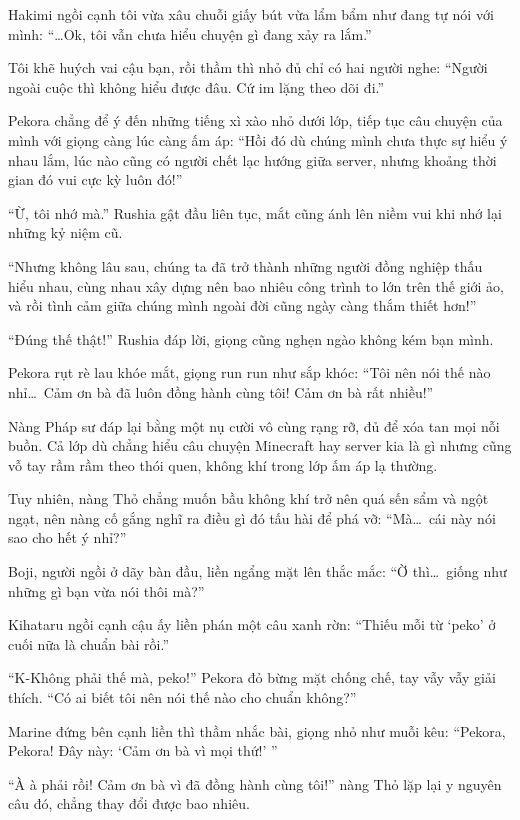 \documentclass[../main.tex]{subfiles}
\begin{document}
Hakimi ngồi cạnh tôi vừa xâu chuỗi giấy bút vừa lẩm bẩm như đang tự nói với mình: ``\dots Ok, tôi vẫn chưa hiểu chuyện gì đang xảy ra lắm.''

Tôi khẽ huých vai cậu bạn, rồi thầm thì nhỏ đủ chỉ có hai người nghe: ``Người ngoài cuộc thì không hiểu được đâu. Cứ im lặng theo dõi đi.''

Pekora chẳng để ý đến những tiếng xì xào nhỏ dưới lớp, tiếp tục câu chuyện của mình với giọng càng lúc càng ấm áp: ``Hồi đó dù chúng mình chưa thực sự hiểu ý nhau lắm, lúc nào cũng có người chết lạc hướng giữa server, nhưng khoảng thời gian đó vui cực kỳ luôn đó!''

``Ừ, tôi nhớ mà.'' Rushia gật đầu liên tục, mắt cũng ánh lên niềm vui khi nhớ lại những kỷ niệm cũ.

``Nhưng không lâu sau, chúng ta đã trở thành những người đồng nghiệp thấu hiểu nhau, cùng nhau xây dựng nên bao nhiêu công trình to lớn trên thế giới ảo, và rồi tình cảm giữa chúng mình ngoài đời cũng ngày càng thắm thiết hơn!''

``Đúng thế thật!'' Rushia đáp lời, giọng cũng nghẹn ngào không kém bạn mình.

Pekora rụt rè lau khóe mắt, giọng run run như sắp khóc: ``Tôi nên nói thế nào nhỉ\dots\ Cảm ơn bà đã luôn đồng hành cùng tôi! Cảm ơn bà rất nhiều!''

Nàng Pháp sư đáp lại bằng một nụ cười vô cùng rạng rỡ, đủ để xóa tan mọi nỗi buồn. Cả lớp dù chẳng hiểu câu chuyện Minecraft hay server kia là gì nhưng cũng vỗ tay rầm rầm theo thói quen, không khí trong lớp ấm áp lạ thường.

Tuy nhiên, nàng Thỏ chẳng muốn bầu không khí trở nên quá sến sẩm và ngột ngạt, nên nàng cố gắng nghĩ ra điều gì đó tấu hài để phá vỡ: ``Mà\dots\ cái này nói sao cho hết ý nhỉ?''

Boji, người ngồi ở dãy bàn đầu, liền ngẩng mặt lên thắc mắc: ``Ờ thì\dots\ giống như những gì bạn vừa nói thôi mà?''

Kihataru ngồi cạnh cậu ấy liền phán một câu xanh rờn: ``Thiếu mỗi từ `peko' ở cuối nữa là chuẩn bài rồi.''

``K-Không phải thế mà, peko!'' Pekora đỏ bừng mặt chống chế, tay vẫy vẫy giải thích. ``Có ai biết tôi nên nói thế nào cho chuẩn không?''

Marine đứng bên cạnh liền thì thầm nhắc bài, giọng nhỏ như muỗi kêu: ``Pekora, Pekora! Đây này: `Cảm ơn bà vì mọi thứ!' ''

``À à phải rồi! Cảm ơn bà vì đã đồng hành cùng tôi!'' nàng Thỏ lặp lại y nguyên câu đó, chẳng thay đổi được bao nhiêu.
\end{document}
